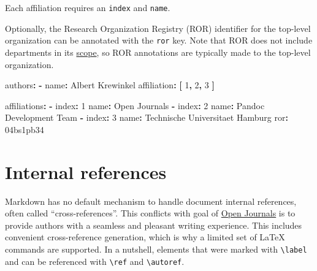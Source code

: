 \documentclass[10pt,a4paper,onecolumn]{article}
\newenvironment{Shaded}{}{}
\newcommand{\AttributeTok}[1]{\textcolor[rgb]{0.49,0.56,0.16}{#1}}
\newcommand{\DecValTok}[1]{\textcolor[rgb]{0.25,0.63,0.44}{#1}}
\newcommand{\FunctionTok}[1]{\textcolor[rgb]{0.02,0.16,0.49}{#1}}
\newcommand{\KeywordTok}[1]{\textcolor[rgb]{0.00,0.44,0.13}{\textbf{#1}}}
\begin{document}
Each affiliation requires an \texttt{index} and \texttt{name}.

Optionally, the Research Organization Registry (ROR) identifier for the
top-level organization can be annotated with the \texttt{ror} key. Note
that ROR does not include departments in its
\href{https://ror.org/registry/\#scope-and-criteria-for-inclusion}{scope},
so ROR annotations are typically made to the top-level organization.

\begin{Shaded}
\begin{Highlighting}[]
\FunctionTok{authors}\KeywordTok{:}
\AttributeTok{  }\KeywordTok{{-}}\AttributeTok{ }\FunctionTok{name}\KeywordTok{:}\AttributeTok{ Albert Krewinkel}
\AttributeTok{    }\FunctionTok{affiliation}\KeywordTok{:}\AttributeTok{ }\KeywordTok{[}\AttributeTok{ }\DecValTok{1}\KeywordTok{,}\AttributeTok{ }\DecValTok{2}\KeywordTok{,}\AttributeTok{ }\DecValTok{3}\AttributeTok{ }\KeywordTok{]}

\FunctionTok{affiliations}\KeywordTok{:}
\AttributeTok{  }\KeywordTok{{-}}\AttributeTok{ }\FunctionTok{index}\KeywordTok{:}\AttributeTok{ }\DecValTok{1}
\AttributeTok{    }\FunctionTok{name}\KeywordTok{:}\AttributeTok{ Open Journals}
\AttributeTok{  }\KeywordTok{{-}}\AttributeTok{ }\FunctionTok{index}\KeywordTok{:}\AttributeTok{ }\DecValTok{2}
\AttributeTok{    }\FunctionTok{name}\KeywordTok{:}\AttributeTok{ Pandoc Development Team}
\AttributeTok{  }\KeywordTok{{-}}\AttributeTok{ }\FunctionTok{index}\KeywordTok{:}\AttributeTok{ }\DecValTok{3}
\AttributeTok{    }\FunctionTok{name}\KeywordTok{:}\AttributeTok{ Technische Universitaet Hamburg}
\AttributeTok{    }\FunctionTok{ror}\KeywordTok{:}\AttributeTok{ 04bs1pb34}
\end{Highlighting}
\end{Shaded}

\section{Internal references}\label{internal-references}

Markdown has no default mechanism to handle document internal
references, often called ``cross-references''. This conflicts with goal
of \href{https://theoj.org}{Open Journals} is to provide authors with a
seamless and pleasant writing experience. This includes convenient
cross-reference generation, which is why a limited set of LaTeX commands
are supported. In a nutshell, elements that were marked with
\texttt{\textbackslash{}label} and can be referenced with
\texttt{\textbackslash{}ref} and \texttt{\textbackslash{}autoref}.
\end{document}
